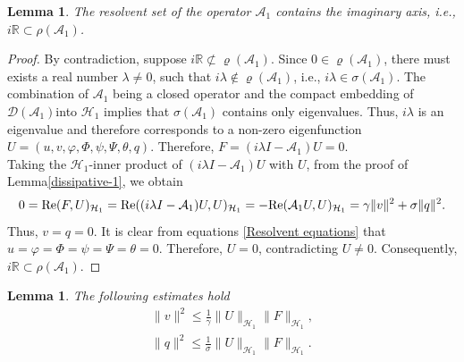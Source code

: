 \documentclass[11pt,reqno]{article}
\newtheorem{lemma}[theorem]{Lemma}
\begin{document}
  \begin{lemma}\label{lemma-iR}
  	The resolvent set of the operator $\mathcal{A}_1$ contains the imaginary axis, i.e., $i\mathbb{R} \subset \rho(\mathcal{A}_1)$.
  \end{lemma}
  \begin{proof}
  	By contradiction, suppose $i\mathbb{R} \not\subset \varrho(\mathcal{A}_1)$. Since $0 \in \varrho(\mathcal{A}_1)$, there must exists a real number $\lambda \neq 0$, such that $i\lambda \not\in \varrho(\mathcal{A}_1)$, i.e., $i\lambda \in \sigma(\mathcal{A}_1)$.
  	The combination of $\mathcal{A}_1$ being a closed operator and the compact embedding of $\mathcal{D}(\mathcal{A}_1)$into
  	$\mathcal{H}_1$ implies that $\sigma(\mathcal{A}_1)$ contains only eigenvalues. Thus, $i \lambda$ is an eigenvalue and therefore corresponds to a non-zero eigenfunction $U=(u,v,\varphi,\Phi,\psi,\Psi,\theta,q)$. Therefore, $F=(i\lambda I-\mathcal{A}_1)U = 0$. \\
  	Taking the $\mathcal{H}_1$-inner product of $(i\lambda I-\mathcal{A}_1)U$ with $U$, from the proof of Lemma\ref{dissipative-1}, we obtain
  	\begin{align*}
  		0={\rm Re}(F,U)_{\mathcal{H}_1}={\rm Re}((i\lambda I-\mathcal{A}_1)U,U)_{\mathcal{H}_1}=-{\rm Re}(\mathcal{A}_1U,U)_{\mathcal{H}_1}=\gamma\|v\|^2+\sigma\|q\|^2.
  	\end{align*}
  	Thus, $v=q=0$. It is clear from equations \eqref{Resolvent equations} that $u=\varphi=\Phi=\psi=\Psi=\theta=0$. Therefore, $U=0$, contradicting $U \neq 0$. Consequently, $i\mathbb{R} \subset \rho(\mathcal{A}_1)$.
  \end{proof}
  \begin{lemma}\label{lemma-v,q}
  	The following estimates hold
  	\begin{align}
  		\|v\|^2 \leq \frac{1}{\gamma}\|U\|_{\mathcal{H}_1}\|F\|_{\mathcal{H}_1}, \label{estimate-v}\\
  		\|q\|^2 \leq \frac{1}{\sigma}\|U\|_{\mathcal{H}_1}\|F\|_{\mathcal{H}_1}. \label{estimate-q}
  	\end{align}
  \end{lemma}
\end{document}
